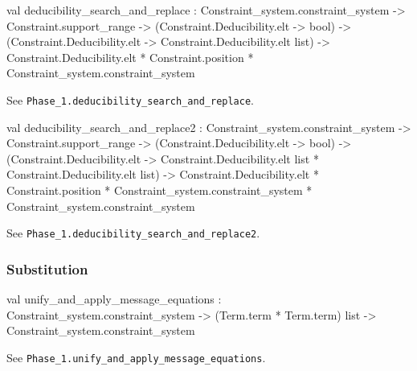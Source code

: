 \begin{ocamldocsigend}
\begin{ocamldocdescription}
\end{ocamldocdescription}


\label{val:Constraint-underscoresystem.Phase-underscore2.deducibility-underscoresearch-underscoreand-underscorereplace}\begin{ocamldoccode}
val deducibility_search_and_replace :
  Constraint_system.constraint_system ->
  Constraint.support_range ->
  (Constraint.Deducibility.elt -> bool) ->
  (Constraint.Deducibility.elt -> Constraint.Deducibility.elt list) ->
  Constraint.Deducibility.elt * Constraint.position *
  Constraint_system.constraint_system
\end{ocamldoccode}
\begin{ocamldocdescription}
See {\tt{Phase\_1.deducibility\_search\_and\_replace}}.


\end{ocamldocdescription}


\label{val:Constraint-underscoresystem.Phase-underscore2.deducibility-underscoresearch-underscoreand-underscorereplace2}\begin{ocamldoccode}
val deducibility_search_and_replace2 :
  Constraint_system.constraint_system ->
  Constraint.support_range ->
  (Constraint.Deducibility.elt -> bool) ->
  (Constraint.Deducibility.elt ->
   Constraint.Deducibility.elt list * Constraint.Deducibility.elt list) ->
  Constraint.Deducibility.elt * Constraint.position *
  Constraint_system.constraint_system * Constraint_system.constraint_system
\end{ocamldoccode}
\begin{ocamldocdescription}
See {\tt{Phase\_1.deducibility\_search\_and\_replace2}}.


\end{ocamldocdescription}


\subsubsection{Substitution}


\label{val:Constraint-underscoresystem.Phase-underscore2.unify-underscoreand-underscoreapply-underscoremessage-underscoreequations}\begin{ocamldoccode}
val unify_and_apply_message_equations :
  Constraint_system.constraint_system ->
  (Term.term * Term.term) list -> Constraint_system.constraint_system
\end{ocamldoccode}
\begin{ocamldocdescription}
See {\tt{Phase\_1.unify\_and\_apply\_message\_equations}}.



\end{ocamldocdescription}
\end{ocamldocsigend}
